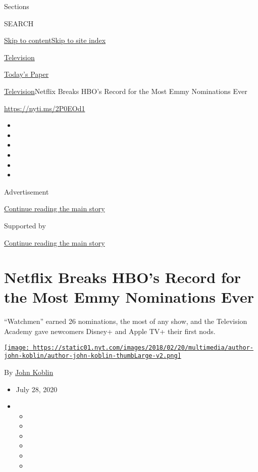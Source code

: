 Sections

SEARCH

\protect\hyperlink{site-content}{Skip to
content}\protect\hyperlink{site-index}{Skip to site index}

\href{https://www.nytimes.com/section/arts/television}{Television}

\href{https://myaccount.nytimes.com/auth/login?response_type=cookie\&client_id=vi}{}

\href{https://www.nytimes.com/section/todayspaper}{Today's Paper}

\href{/section/arts/television}{Television}\textbar{}Netflix Breaks
HBO's Record for the Most Emmy Nominations Ever

\url{https://nyti.ms/2P0EOd1}

\begin{itemize}
\item
\item
\item
\item
\item
\item
\end{itemize}

Advertisement

\protect\hyperlink{after-top}{Continue reading the main story}

Supported by

\protect\hyperlink{after-sponsor}{Continue reading the main story}

\hypertarget{netflix-breaks-hbos-record-for-the-most-emmy-nominations-ever}{%
\section{Netflix Breaks HBO's Record for the Most Emmy Nominations
Ever}\label{netflix-breaks-hbos-record-for-the-most-emmy-nominations-ever}}

``Watchmen'' earned 26 nominations, the most of any show, and the
Television Academy gave newcomers Disney+ and Apple TV+ their first
nods.

\href{https://www.nytimes.com/by/john-koblin}{\texttt{[image: https://static01.nyt.com/images/2018/02/20/multimedia/author-john-koblin/author-john-koblin-thumbLarge-v2.png]}}

By \href{https://www.nytimes.com/by/john-koblin}{John Koblin}

\begin{itemize}
\item
  July 28, 2020
\item
  \begin{itemize}
  \item
  \item
  \item
  \item
  \item
  \item
  \end{itemize}
\end{itemize}

